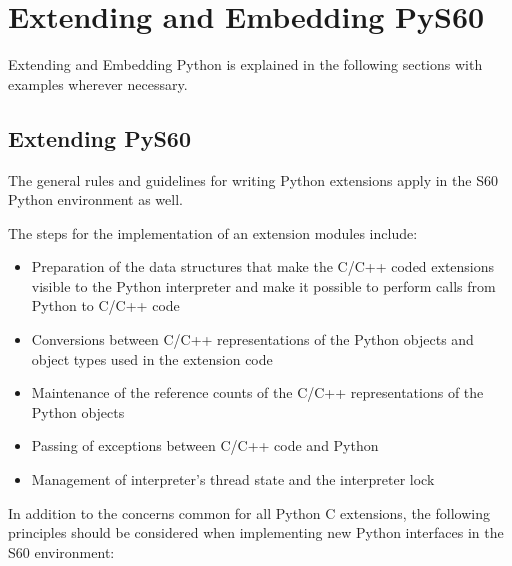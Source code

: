 %
%
%

\chapter{Extending and Embedding PyS60}
\label{extendandembed}
Extending and Embedding Python is explained in the following sections with examples
wherever necessary.

\section{Extending PyS60}
\label{sec:extendingPyS60}

The general rules and guidelines for writing Python extensions apply
in the S60 Python environment as well.

The steps for the implementation of an extension modules include:

\begin{itemize}
\item Preparation of the data structures that make the C/C++ coded extensions
      visible to the Python interpreter and make it possible to perform calls from
      Python to C/C++ code

\item Conversions between C/C++ representations of the Python objects and
      object types used in the extension code

\item Maintenance of the reference counts of the C/C++ representations of the
      Python objects

\item Passing of exceptions between C/C++ code and Python

\item Management of interpreter's thread state and the interpreter lock
\end{itemize}

In addition to the concerns common for all Python C extensions, the
following principles should be considered when implementing new Python
interfaces in the S60 environment:

